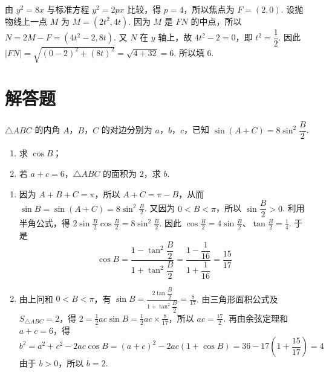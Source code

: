 \begin{solution}
由 \(y^2=8x\) 与标准方程 \(y^2=2px\) 比较，得 \(p=4\)，所以焦点为 \(F=(2,0)\). 设抛物线上一点 \(M\) 为
\(M=(2t^2,4t)\).
因为 \(M\) 是 \(FN\) 的中点，所以 \(N=2M-F=(4t^2-2,8t)\). 又 \(N\) 在 \(y\) 轴上，故 \(4t^2-2=0\)，即 \(t^2=\dfrac12\). 因此
\(|FN|=\sqrt{(0-2)^2+(8t)^2}=\sqrt{4+32}=6\).
所以填 \(6\).
\end{solution}

\section{解答题}

\begin{problem}
\(\triangle ABC\) 的内角 \(A\)，\(B\)，\(C\) 的对边分别为 \(a\)，\(b\)，\(c\)，已知 \(\sin(A+C)=8\sin^2\dfrac B2\).

\begin{enumerate}
\item 求 \(\cos B\)；
\item 若 \(a+c=6\)，\(\triangle ABC\) 的面积为 \(2\)，求 \(b\).
\end{enumerate}
\end{problem}

\begin{solution}
\begin{enumerate}
\item 因为 \(A+B+C=\pi\)，所以 \(A+C=\pi-B\)，从而 \(\sin B=\sin(A+C)=8\sin^2\frac B2\).
又因为 \(0<B<\pi\)，所以 \(\sin\dfrac B2>0\). 利用半角公式，得
\(2\sin\frac B2\cos\frac B2=8\sin^2\frac B2\).
因此
\(\cos\frac B2=4\sin\frac B2\)、\(\tan\frac B2=\frac14\).
于是
\[
\cos B=\frac{1-\tan^2\dfrac B2}{1+\tan^2\dfrac B2}
=\frac{1-\dfrac1{16}}{1+\dfrac1{16}}=\frac{15}{17}
\]

\item 由上问和 \(0<B<\pi\)，有 \(\sin B=\frac{2\tan\dfrac B2}{1+\tan^2\dfrac B2}=\frac8{17}\).
由三角形面积公式及 \(S_{\triangle ABC}=2\)，得
\(2=\frac12ac\sin B=\frac12ac\times\frac8{17}\)，所以 \(ac=\frac{17}{2}\).
再由余弦定理和 \(a+c=6\)，得
\[
b^2=a^2+c^2-2ac\cos B=(a+c)^2-2ac(1+\cos B)
=36-17\left(1+\frac{15}{17}\right)=4
\]
由于 \(b>0\)，所以 \(b=2\).
\end{enumerate}
\end{solution}

